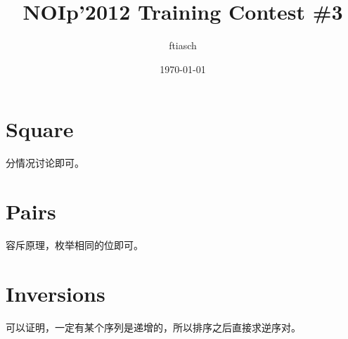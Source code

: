 \documentclass[a4paper]{article}
\title{NOIp'2012 Training Contest \#3}
\author{ftiasch}
\date{\today}
\newcommand{\problem}{\section}
\begin{document}
\maketitle

\problem{Square}

分情况讨论即可。

\problem{Pairs}

容斥原理，枚举相同的位即可。

\problem{Inversions}

可以证明，一定有某个序列是递增的，所以排序之后直接求逆序对。
\end{document}

